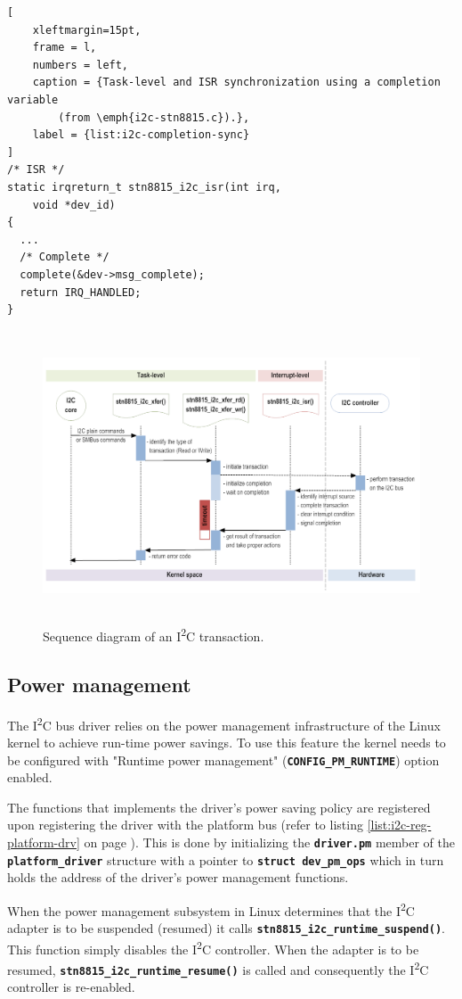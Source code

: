 \documentclass[a4paper,10pt]{article}
\newcommand{\icc}{I\textsuperscript{2}C }
\newcommand{\keyword}[1]{\texttt{\textbf{#1}}}
\begin{document}
\begin{multicols}{2}
\begin{lstlisting}[
	xleftmargin=15pt,
	frame = l,
	numbers = left,
	caption = {Task-level and ISR synchronization using a completion variable
		(from \emph{i2c-stn8815.c}).},
	label = {list:i2c-completion-sync}
]
/* ISR */
static irqreturn_t stn8815_i2c_isr(int irq,
	void *dev_id)
{
  ...
  /* Complete */
  complete(&dev->msg_complete);
  return IRQ_HANDLED;
}

\end{lstlisting}

\begin{figure}
 \centering
 \includegraphics[width=14cm, height=8.6cm]
 	{./figures/i2c-data-transfer-seq-diag.png}
 \caption{Sequence diagram of an \icc transaction.}
 \label{fig:i2c-trans-seq-diag}
\end{figure}


\subsection{Power management}
\label{sec:adapter_power_management}

The \icc bus driver relies on the power management infrastructure of the Linux
kernel to achieve run-time power savings. To use this feature the kernel needs
to be configured with "Runtime power management" (\keyword{CONFIG\_PM\_RUNTIME})
option enabled.

The functions that implements the driver's power saving policy are registered
upon registering the driver with the platform bus (refer to listing
\ref{list:i2c-reg-platform-drv} on page \pageref{list:i2c-reg-platform-drv}).
This is done by initializing the \keyword{driver.pm} member of the
\keyword{platform\_driver} structure with a pointer to
\keyword{struct dev\_pm\_ops} which in turn holds the address of the driver's
power management functions.

When the power management subsystem in Linux determines that the \icc adapter
is to be suspended (resumed) it calls \keyword{stn8815\_i2c\_runtime\_suspend()}.
This function simply disables the \icc controller.  
When the adapter is to be resumed, \keyword{stn8815\_i2c\_runtime\_resume()} is called and consequently the \icc controller is re-enabled.



\end{multicols}
\end{document}
